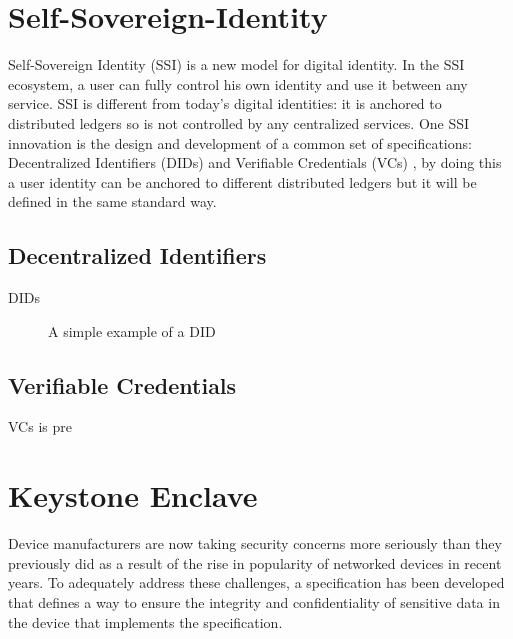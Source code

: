 \section{Self-Sovereign-Identity }
Self-Sovereign Identity (SSI) \cite{tobin2016inevitable} is a new model for digital identity. In the SSI ecosystem, a user can fully control his own identity and use it between any service. SSI is different from today's digital identities: it is anchored to distributed ledgers so is not controlled by any centralized services.
One SSI innovation is the design and development of a common set of specifications: 
Decentralized Identifiers (DIDs) \cite{didW3C} and Verifiable Credentials (VCs) \cite{vcW3C}, by doing this a user identity can be anchored to different distributed ledgers but it will be defined in the same standard way.

\subsection{Decentralized Identifiers}
DIDs 
\begin{figure}
    
    \caption{A simple example of a DID}
\end{figure}
\subsection{Verifiable Credentials}
VCs is pre

\section{Keystone Enclave}
Device manufacturers are now taking security concerns more seriously than they previously did as a result of the rise in popularity of networked devices in recent years.
To adequately address these challenges, a specification has been developed that defines a way to ensure the integrity and confidentiality of sensitive data in the device that implements the specification.
\cite{IntroTEE}
